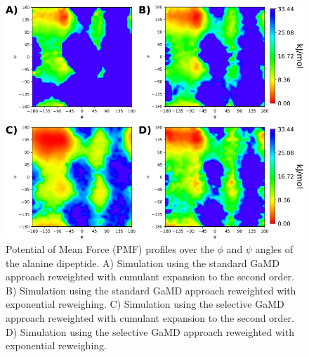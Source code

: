 \begin{figure}[H]
\centering
\includegraphics[scale=.43]{../07_tutorial_04/figures/pmf_tutorial}
\caption{Potential of Mean Force (PMF) profiles over the $\phi$ and $\psi$ angles of the alanine dipeptide. A) Simulation using the standard GaMD approach reweighted with cumulant expansion to the second order. B) Simulation using the standard GaMD approach reweighted with exponential reweighing. C) Simulation using the selective GaMD approach reweighted with cumulant expansion to the second order. D) Simulation using the selective GaMD approach reweighted with exponential reweighing. }
\label{aladip_pmf}
\end{figure}


